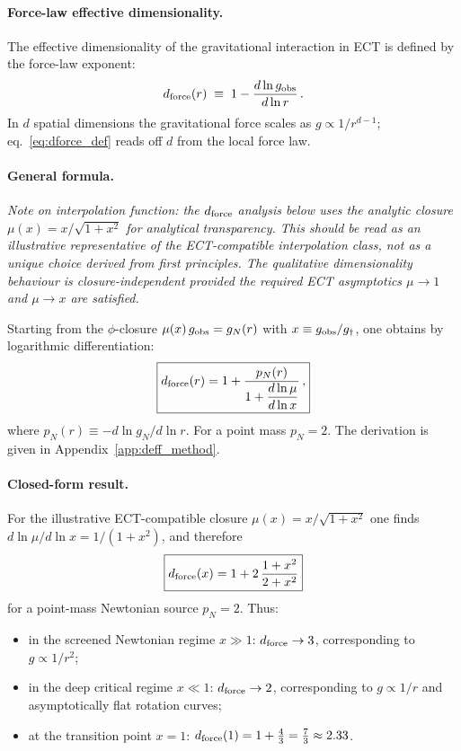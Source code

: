 \documentclass[11pt,a4paper]{article}
\numberwithin{equation}{section}
\begin{document}
\paragraph{Force-law effective dimensionality.}

The effective dimensionality of the gravitational interaction
in ECT is defined by the force-law exponent:
\begin{equation}
d_{\rm force}(r)
\;\equiv\; 1 - \frac{d\ln g_{\rm obs}}{d\ln r}\,.
\label{eq:dforce_def}
\end{equation}
In $d$ spatial dimensions the gravitational force scales as
$g \propto 1/r^{d-1}$; eq.~\eqref{eq:dforce_def} reads off
$d$ from the local force law.

\paragraph{General formula.}
\textit{Note on interpolation function: the $d_{\rm force}$
analysis below uses the analytic closure
$\mu(x)=x/\sqrt{1+x^2}$ for analytical transparency.
This should be read as an illustrative representative of the
ECT-compatible interpolation class, not as a unique choice
derived from first principles.  The qualitative dimensionality
behaviour is closure-independent provided the required ECT
asymptotics $\mu\to1$ and $\mu\to x$ are satisfied.}

Starting from the $\phi$-closure
$\mu(x)\,g_{\rm obs} = g_N(r)$ with $x \equiv g_{\rm obs}/g_\dagger$,
one obtains by logarithmic differentiation:
\begin{equation}
\boxed{
d_{\rm force}(r) = 1 + \frac{p_N(r)}
  {1 + \dfrac{d\ln\mu}{d\ln x}}\,,
}
\label{eq:dforce_general}
\end{equation}
where $p_N(r) \equiv -d\ln g_N/d\ln r$.
For a point mass $p_N = 2$.
The derivation is given in Appendix~\ref{app:deff_method}.

\paragraph{Closed-form result.}
For the illustrative ECT-compatible closure
$\mu(x) = x/\sqrt{1+x^2}$ one finds
$d\ln\mu/d\ln x = 1/(1+x^2)$, and therefore
\begin{equation}
\boxed{
d_{\rm force}(x)
=
1 + 2\,\frac{1+x^2}{2+x^2}
}
\label{eq:dforce_closed}
\end{equation}
for a point-mass Newtonian source $p_N=2$.
Thus:
\begin{itemize}
  \item in the screened Newtonian regime $x\gg1$:
    $d_{\rm force}\to 3$, corresponding to $g\propto 1/r^2$;
  \item in the deep critical regime $x\ll1$:
    $d_{\rm force}\to 2$, corresponding to $g\propto 1/r$
    and asymptotically flat rotation curves;
  \item at the transition point $x=1$:
    $d_{\rm force}(1)=1+\tfrac{4}{3}=\tfrac{7}{3}\approx2.33$.
\end{itemize}
\end{document}
